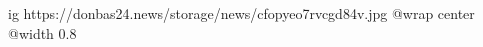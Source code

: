  
 
 
 
 

\ifcmt
  ig https://donbas24.news/storage/news/cfopyeo7rvcgd84v.jpg
  @wrap center
  @width 0.8
\fi
